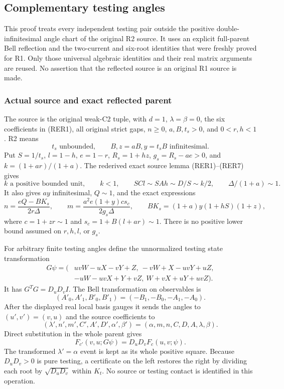 \subsection{Complementary testing angles}
\label{component:p8f8780350b13}

\label{p8f8780350b13:sec:r2-rederived-outer-join}

This proof treats every independent testing pair outside the positive
double-infinitesimal angle chart of the original R2 source.  It uses an
explicit full-parent Bell reflection and the two-current and six-root
identities that were freshly proved for R1.  Only those universal algebraic
identities and their real matrix arguments are reused.  No assertion that
the reflected source is an original R1 source is made.

\subsubsection*{Actual source and exact reflected parent}

The source is the original weak-C2 tuple, with $d=1$, $\lambda=\beta=0$,
the six coefficients in (RER1), all original strict gaps, $n\geq0$,
$a,B,t_s>0$, and $0<r,h<1$.  R2 means
\[
t_s\text{ unbounded},\qquad B, z=aB, y=t_sB\text{ infinitesimal}.
\tag{R2O1}
\]
Put $S=1/t_s$, $l=1-h$, $e=1-r$, $R_s=1+hz$,
$g_s=R_s-ae>0$, and $k=(1+ar)/(1+a)$.  The rederived exact source
lemma (RER1)--(RER7) gives
\[
k\text{ a positive bounded unit},\qquad k<1,\qquad
SC l\sim SAh\sim D/S\sim k/2,
\qquad \Delta/(1+a)\sim1.
\tag{R2O2}
\]
It also gives $ay$ infinitesimal, $Q\sim1$, and the exact expressions
\[
n=\frac{eQ-BK_s}{2r\Delta},\qquad
m=\frac{a^2e(1+y)c s_c}{2g_s\Delta},\qquad
BK_s=(1+a)y(1+hS)(1+z),
\tag{R2O3}
\]
where $c=1+zr\sim1$ and $s_c=1+B(l+ar)\sim1$.
There is no positive lower bound assumed on $r,h,l$, or $g_s$.

For arbitrary finite testing angles define the unnormalized testing
state transformation
\[
\begin{split}
G\psi=(&uvW-uX-vY+Z,\ -vW+X-uvY+uZ,\\
       &-uW-uvX+Y+vZ,\ W+vX+uY+uvZ).
\end{split}
\tag{R2O4}
\]
It has $G^TG=D_uD_v I$.  The Bell transformation on observables is
\[
(A'_0,A'_1,B'_0,B'_1)=(-B_1,-B_0,-A_1,-A_0).
\]
After the displayed real local basis gauges it sends the angles to
$(u',v')=(v,u)$ and the source coefficients to
\[
(\lambda',n',m',C',A',D',\alpha',\beta')
 =(\alpha,m,n,C,D,A,\lambda,\beta).
\tag{R2O5}
\]
Direct substitution in the whole parent gives
\[
F_{c'}(v,u;G\psi)=D_uD_v F_c(u,v;\psi).
\tag{R2O6}
\]
  The transformed
$\lambda'=\alpha$ event is kept as its whole positive square.
Because $D_uD_v>0$ is pure testing, a certificate on the left restores
the right by dividing each root by $\sqrt{D_uD_v}$ within $K_t$.
No source or testing contact is identified in this operation.

